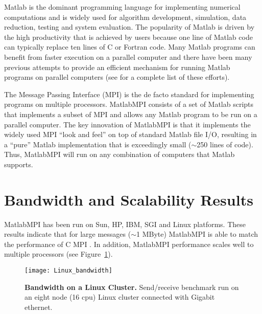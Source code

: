 \documentclass[11pt,twocolumn]{article}
\begin{document}
  Matlab \cite{Matlab} is the dominant programming language for
implementing numerical computations and is widely used for algorithm
development, simulation, data reduction, testing and system
evaluation.  The popularity of Matlab is driven by the high
productivity that is achieved by users because one line of Matlab code
can typically replace ten lines of C or Fortran code.  Many Matlab
programs can benefit from faster execution on a parallel computer and
there have been many previous attempts to provide an efficient
mechanism for running Matlab programs on parallel computers (see
\cite{Choy} for a complete list of these efforts).

  The Message Passing Interface (MPI) \cite{MPI} is the de facto
standard for implementing programs on multiple processors.
MatlabMPI\cite{Kepner2001} consists of a set of Matlab scripts that
implements a subset of MPI and allows any Matlab program to be run on
a parallel computer.  The key innovation of MatlabMPI is that it
implements the widely used MPI ``look and feel'' on top of standard
Matlab file I/O, resulting in a ``pure'' Matlab implementation that is
exceedingly small ($\sim$250 lines of code). Thus, MatlabMPI will run
on any combination of computers that Matlab supports.

\section{Bandwidth and Scalability Results}

  MatlabMPI has been run on Sun, HP, IBM, SGI and Linux platforms.
These results indicate that for large messages ($\sim$1 MByte)
MatlabMPI is able to match the performance of C MPI \cite{Kepner2001}.
In addition, MatlabMPI performance scales well to multiple processors
(see Figure~\ref{fig:Linux_bandwidth}).
\begin{figure}[tbh]
\centerline{\texttt{[image: Linux\_bandwidth]}}
\caption{ {\bf Bandwidth on a Linux Cluster.}
Send/receive benchmark run on an eight node (16 cpu) Linux cluster
connected with Gigabit ethernet.
}
\label{fig:Linux_bandwidth}
\end{figure}
\end{document}
